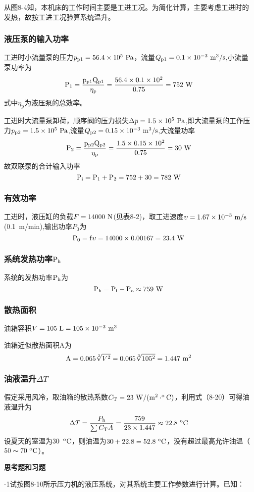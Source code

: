 从图8-4知，本机床的工作时间主要是工进工况。为简化计算，主要考虑工进时的发热，故按工进工况验算系统温升。

\subsubsection{液压泵的输入功率}

工进时小流量泵的压力$p_\text{p1}=56.4\times10^5\rm \ Pa$，流量$Q_\text{p1}=0.1\times10^{-3} \rm \ m^3/s$,小流量泵功率为
\[
\rm P_1=\frac{p_\text{p1}Q_\text{p1}}{\eta_\text{p}}=\frac{56.4\times0.1\times10^2}{0.75}=752\  \rm W
\]
式中$\eta_\text{p}$为液压泵的总效率。

工进时大流量泵卸荷，顺序阀的压力损失$\Delta p=1.5\times10^5\rm \ Pa$,即大流量泵的工作压力$p_\text{p2}=1.5\times10^5\rm \ Pa$,流量$Q_\text{p2}=0.15\times10^{-3}\rm \ m^3/s$,大流量功率
\[
\rm P_2=\frac{p_\text{p2} Q_\text{p2}}{\eta_\text{p}}=\frac{1.5\times0.15\times10^2}{0.75}=30\rm \ W
\]
故双联泵的合计输入功率
\[
\rm P_i=\rm P_1+\rm P_2=752+30=782\rm \ W
\]
\subsubsection{有效功率}

工进时，液压缸的负载$F=14000\rm \ N $(见表8-2)，取工进速度$\upsilon=1.67\times10^{-3} \rm \ m/s$(0.1\ m/min),输出功率$P_0$为
\[
\rm P_0=f\upsilon=14000\times0.00167=23.4\rm \ W
\]
\subsubsection{系统发热功率$\rm P_\text{h}$}

系统的发热功率$\rm P_\text{h}$为
\[
\rm P_\text{h}=\rm P_\text{i}-\rm P_\text{o} \approx 759\rm \ W
\]
\subsubsection{散热面积}

油箱容积$V=105\rm \ L=105\times10^{-3}\rm \  m^3$

油箱近似散热面积A为
\[
\rm A=0.065\sqrt[3]{V^2}=0.065\sqrt[3]{105^2
}=1.447\rm \ m^2
\]
\subsubsection{油液温升$\Delta T$}

假定采用风冷，取油箱的散热系数$C_\text{T}=23\rm \ W/(m^2\cdot ^\text{o} \rm C)$，利用式（8-20）可得油液温升为
\begin{equation}
\Delta T=\frac{P_\text{h}}{\sum C_\text{T} A}=\frac{759}{23\times1.447}\approx22.8 \  ^\text{o} \rm C
\end{equation}
设夏天的室温为30\ $ ^\text{o} \rm C$，则油温为$30+22.8=52.8\  ^\text{o} \rm C$，没有超过最高允许油温（$50\thicksim70\  ^\text{o} \rm C$）。
\begin{center}
\textbf{思考题和习题}
\end{center}
-1\qquad 试按图8-10所示压力机的液压系统，对其系统主要工作参数进行计算。已知：

